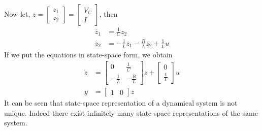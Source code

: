 \documentclass[twoside]{article}
\begin{document}
Now let, $z = \left[ \begin{array}{c} z_1 \\ z_2 \end{array} \right] =
\left[ \begin{array}{c} V_C \\ I \end{array} \right]$, then 
%
\begin{align*}
	\dot{z_1} &= \frac{1}{C} z_2 \\
	\dot{z_2} &= -\frac{1}{L} z_1 - \frac{R}{L} z_2 + \frac{1}{L} u
\end{align*}
%
If we put the equations in state-space form, we obtain
%
\begin{align*}
 \dot{z} &= \left[  \begin{array}{cc} 0 & \frac{1}{C} \\ -\frac{1}{L} &  -\frac{R}{L}  \end{array} \right] z 
 +  \left[  \begin{array}{c} 0 \\ \frac{1}{L} \end{array} \right] u
 \\
 y &= \left[  \begin{array}{cc} 1 & 0 \end{array} \right] z
\end{align*}
%
It can be seen that state-space representation of a dynamical system
is not unique. Indeed there exist infinitely many state-space
representations of the same system.
%


\end{document}
